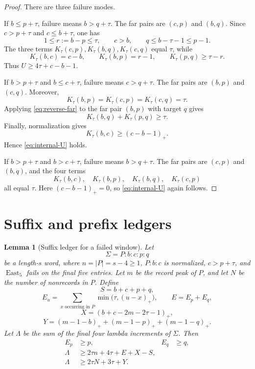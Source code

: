 \documentclass[11pt]{article}
\newtheorem{lemma}[theorem]{Lemma}
\theoremstyle{definition}
\theoremstyle{remark}
\newcommand{\East}{\operatorname{East}}
\begin{document}
\begin{proof}
There are three failure modes.

If \(b\le p+\tau\), failure means \(b>q+\tau\).  The far pairs are
\((c,p)\) and \((b,q)\).  Since \(c>p+\tau\) and
\(c\le b+\tau\), one has
\[
  1\le r:=b-p\le\tau,
  \qquad c>b,
  \qquad q\le b-\tau-1\le p-1.
\]
The three terms \(K_\tau(c,p),K_\tau(b,q),K_\tau(c,q)\) equal
\(\tau\), while
\[
  K_\tau(b,c)=c-b,
  \qquad
  K_\tau(b,p)=r-1,
  \qquad
  K_\tau(p,q)\ge\tau-r.
\]
Thus \(U\ge4\tau+c-b-1\).

If \(b>p+\tau\) and \(b\le c+\tau\), failure means
\(c>q+\tau\).  The far pairs are \((b,p)\) and \((c,q)\).
Moreover,
\[
  K_\tau(b,p)=K_\tau(c,p)=K_\tau(c,q)=\tau.
\]
Applying \eqref{eq:reverse-far} to the far pair \((b,p)\) with target
\(q\) gives
\[
  K_\tau(b,q)+K_\tau(p,q)\ge\tau.
\]
Finally, normalization gives
\[
  K_\tau(b,c)\ge(c-b-1)_+.
\]
Hence \eqref{eq:internal-U} holds.

If \(b>p+\tau\) and \(b>c+\tau\), failure means
\(b>q+\tau\).  The far pairs are \((c,p)\) and \((b,q)\), and the
four terms
\[
  K_\tau(b,c),\quad K_\tau(b,p),\quad
  K_\tau(b,q),\quad K_\tau(c,p)
\]
all equal \(\tau\).  Here \((c-b-1)_+=0\), so
\eqref{eq:internal-U} again follows.
\end{proof}

\section{Suffix and prefix ledgers}

\begin{lemma}[Suffix ledger for a failed window]
\label{lem:suffix-ledger}
Let
\[
  \Sigma=P:b:c:p:q
\]
be a length-\(s\) word, where \(n=|P|=s-4\ge1\), \(P:b:c\) is
normalized, \(c>p+\tau\), and \(\East_5\) fails on the final five
entries.  Let \(m\) be the record peak of \(P\), and let \(N\) be the
number of nonrecords in \(P\).  Define
\[
  S=b+c+p+q,
\]
\[
  E_u=\sum_{x\text{ occurring in }P}
       \min\bigl(\tau,(u-x)_+\bigr),
  \qquad E=E_p+E_q,
\]
\[
  X=(b+c-2m-2\tau-1)_+,
\]
\[
  Y=(m-1-b)_++(m-1-p)_++(m-1-q)_+.
\]
Let \(\Lambda\) be the sum of the final four lambda increments of
\(\Sigma\).  Then
\begin{align}
  E_p&\ge p,
  &E_q&\ge q,
  \label{eq:E-pays}\\
  \Lambda&\ge2\tau n+4\tau+E+X-S,
  \label{eq:suffix-refined}\\
  \Lambda&\ge2\tau N+3\tau+Y.
  \label{eq:suffix-low}
\end{align}
\end{lemma}
\end{document}
